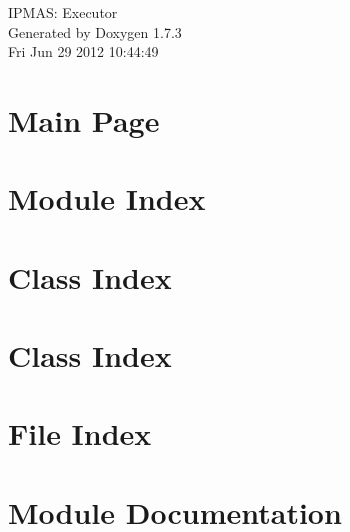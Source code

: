 \documentclass[letterpaper]{book}
\begin{document}
\hypersetup{pageanchor=false}
\begin{titlepage}
\vspace*{7cm}
\begin{center}
{\Large IPMAS: Executor }\\
\vspace*{1cm}
{\large Generated by Doxygen 1.7.3}\\
\vspace*{0.5cm}
{\small Fri Jun 29 2012 10:44:49}\\
\end{center}
\end{titlepage}
\clearemptydoublepage
{}
\tableofcontents
\clearemptydoublepage
{}
\hypersetup{pageanchor=true}
\chapter{Main Page}
\label{index}\hypertarget{index}{}
\chapter{Module Index}

\chapter{Class Index}

\chapter{Class Index}

\chapter{File Index}

\chapter{Module Documentation}

\end{document}

